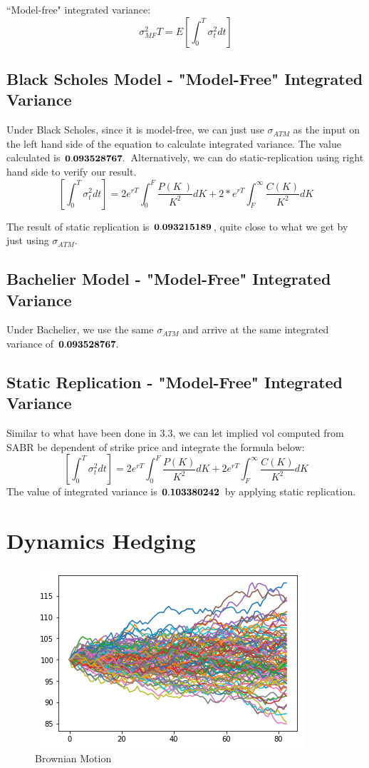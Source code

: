 \documentclass[fleqn,12pt]{SelfArx}
\begin{document}
\noindent``Model-free" integrated variance:
$$\sigma_{MF}^2 T=E\left[\int_{0}^{T}\sigma_t^2 dt \right]$$

\subsection{Black Scholes Model - "Model-Free" Integrated Variance}
\noindent Under Black Scholes, since it is model-free, we can just use $\sigma_{ATM}$ as the input on the left hand side of the equation to calculate integrated variance. The value calculated is $\bf{0.093528767.}$ Alternatively, we can do static-replication using right hand side to verify our result.
$$\left[\int_{0}^{T}\sigma_t^2 dt\right]=2e^{rT}\int_{0}^{F}\frac{P(K\	)}{K^2}dK+2*e^{rT}\int_{F}^{\infty}\frac{C(K)}{K^2}dK$$

The result of static replication is $\bf{0.093215189}$, quite close to what we get by just using $\sigma_{ATM}$.\\

\subsection{Bachelier Model - "Model-Free" Integrated Variance}
Under Bachelier, we use the same $\sigma_{ATM}$ and arrive at the same integrated variance of $\bf{ 0.093528767}.$\\

\subsection{Static Replication - "Model-Free" Integrated Variance}
Similar to what have been done in 3.3, we can let implied vol computed from SABR be dependent of strike price and integrate the formula below:
$$\left[\int_{0}^{T}\sigma_t^2 dt\right]=2e^{rT}\int_{0}^{F}\frac{P(K)}{K^2}dK+2e^{rT}\int_{F}^{\infty}\frac{C(K)}{K^2}dK$$
The value of integrated variance is $\bf{0.103380242}$ by applying static replication.

\section{Dynamics Hedging}

\begin{figure}[ht]\centering
	\includegraphics{Brownian}
	\caption{Brownian Motion}
\end{figure}
\end{document}
